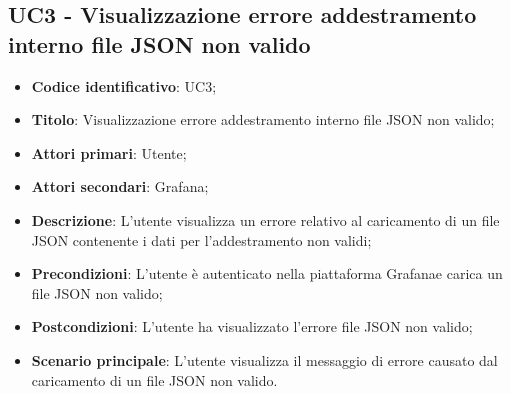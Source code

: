 \subsection{UC3 - Visualizzazione errore addestramento interno file JSON non valido}
\begin{itemize}
	\item \textbf{Codice identificativo}: UC3;
	\item \textbf{Titolo}: Visualizzazione errore addestramento interno file JSON non valido;
	\item \textbf{Attori primari}: Utente;
	\item \textbf{Attori secondari}: Grafana\glo;
	\item \textbf{Descrizione}: L'utente visualizza un errore relativo al caricamento di un file JSON contenente i dati per l'addestramento non validi;
	\item \textbf{Precondizioni}: L'utente è autenticato nella piattaforma Grafana\glosp e carica un file JSON non valido;
	\item \textbf{Postcondizioni}: L'utente ha visualizzato l'errore file JSON non valido;	
	\item \textbf{Scenario principale}: L'utente visualizza il messaggio di errore causato dal caricamento di un file JSON non valido.	
\end{itemize}

